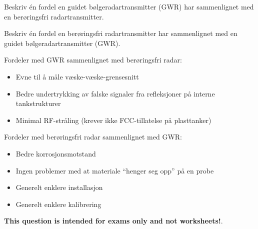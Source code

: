 

Beskriv én fordel en guidet bølgeradartransmitter (GWR) har sammenlignet med en berøringsfri radartransmitter.

\vskip 50pt

Beskriv én fordel en berøringsfri radartransmitter har sammenlignet med en guidet bølgeradartransmitter (GWR).

\vskip 50pt







Fordeler med GWR sammenlignet med berøringsfri radar:

\begin{itemize}
\item{} Evne til å måle væske-væske-grensesnitt
\item{} Bedre undertrykking av falske signaler fra refleksjoner på interne tankstrukturer
\item{} Minimal RF-stråling (krever ikke FCC-tillatelse på plasttanker)
\end{itemize}

\vskip 10pt

Fordeler med berøringsfri radar sammenlignet med GWR:

\begin{itemize}
\item{} Bedre korrosjonsmotstand
\item{} Ingen problemer med at materiale ``henger seg opp'' på en probe
\item{} Generelt enklere installasjon
\item{} Generelt enklere kalibrering
\end{itemize}







{\bf This question is intended for exams only and not worksheets!}.

